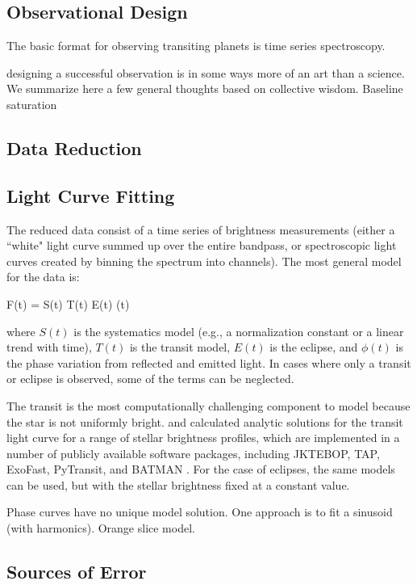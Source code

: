 \documentclass[graybox,natbib,nosecnum]{svmult}
\begin{document}
\subsection{Observational Design}
The basic format for observing transiting planets is time series spectroscopy. 

designing a successful observation is in some ways more of an art than a science. We summarize here a few general thoughts based on collective wisdom.
Baseline
saturation


\subsection{Data Reduction}

\subsection{Light Curve Fitting}
The reduced data consist of a time series of brightness measurements (either a ``white" light curve summed up over the entire bandpass, or spectroscopic light curves created by binning the spectrum into channels).  The most general model for the data is:

F(t) = S(t) \times T(t) \times E(t) \times \phi(t)

where $S(t)$ is the systematics model (e.g., a normalization constant or a linear trend with time), $T(t)$ is the transit model, $E(t)$ is the eclipse, and $\phi(t)$ is the phase variation from reflected and emitted light. In cases where only a transit or eclipse is observed, some of the terms can be neglected.

The transit is the most computationally challenging component to model because the star is not uniformly bright. \cite{mandel02} and \cite{gimenez06} calculated analytic solutions for the transit light curve for a range of stellar brightness profiles,  which are implemented in a number of publicly available software packages, including JKTEBOP, TAP, ExoFast, PyTransit, and BATMAN \citep{southworth04, gazak12, eastman13, parviainen15, kreidberg15}. For the case of eclipses, the same models can be used, but with the stellar brightness fixed at a constant value.

Phase curves have no unique model solution. One approach is to fit a sinusoid (with harmonics). Orange slice model.

\subsection{Sources of Error}
\end{document}
